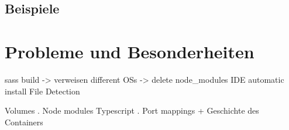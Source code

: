 \subsection{Beispiele}
\label{sub:examples}



\section{Probleme und Besonderheiten}
\label{sec:container-problems}
sass build -> verweisen
different OSs -> delete node_modules
IDE automatic install
File Detection



Volumes
. Node modules Typescript
. Port mappings + Geschichte des Containers
